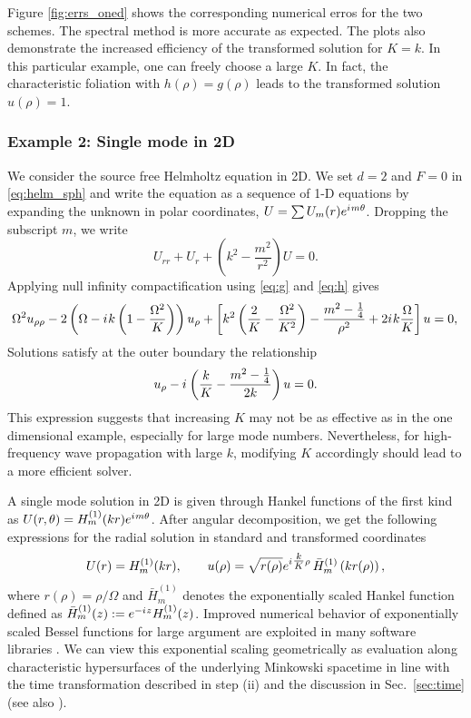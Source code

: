 \documentclass[final,onefignum,onetabnum]{siamart190516}
\newcommand{\iu}{{i\mkern1mu}}
\begin{document}
Figure \ref{fig:errs_oned} shows the corresponding numerical erros for the two schemes. The spectral method is more accurate as expected. The plots also demonstrate the increased efficiency of the transformed solution for $K=k$. In this particular example, one can freely choose a large $K$. In fact, the characteristic foliation with $h(\rho) =g(\rho)$ leads to the transformed solution $u(\rho)=1$. 

\subsubsection{Example 2: Single mode in 2D} 
We consider the source free Helmholtz equation in 2D. We set $d=2$ and $F=0$ in \eqref{eq:helm_sph} and write the equation as a sequence of 1-D equations by expanding the unknown in polar coordinates, $U=\sum U_m(r) e^{\iu m \theta}$. Dropping the subscript $m$, we write
\begin{equation}
	 U_{rr} + U_r + \left(k^2 - \frac{m^2}{r^2}\right)U = 0.
\end{equation}
Applying null infinity compactification using \eqref{eq:g} and \eqref{eq:h} gives 
\begin{equation}
\label{eq:hyp_2d}
	\Omega^2 u_{\rho\rho} - 2 \left(\Omega-\iu k \left(1-\frac{\Omega^2}{K}\right) \right) u_\rho + \left[k^2 \left(\frac{2}{K}-\frac{\Omega^2}{K^2}\right) - \frac{m^2-\tfrac{1}{4}}{\rho^2}  + 2 \iu k \frac{\Omega}{K} \right] u = 0,\\
\end{equation}
Solutions satisfy at the outer boundary the relationship
\[ u_\rho - \iu \left(\frac{k}{K} - \frac{m^2-\tfrac{1}{4}}{2k}\right)u = 0.  \]
This expression suggests that increasing $K$ may not be as effective as in the one dimensional example, especially for large mode numbers. Nevertheless, for high-frequency wave propagation with large $k$, modifying $K$ accordingly should lead to a more efficient solver.

A single mode solution in 2D is given through Hankel functions of the first kind as  $U(r, \theta) = H_m^{(1)}(k r) e^{\iu m \theta}$. After angular decomposition, we get the following expressions for the radial solution in standard and transformed coordinates
\begin{equation}\label{eq:hankel_soln}
	U(r) = H_m^{(1)}(k r), \qquad u(\rho) = \sqrt{r(\rho)} e^{\iu \tfrac{k}{K} \rho} \, \bar{H}_m^{(1)}\left(k r(\rho)\right),
\end{equation}
where $r(\rho)=\rho/\Omega$ and $\bar{H}_{m}^{(1)}$ denotes the exponentially scaled Hankel function defined as $\bar{H}_{m}^{(1)}(z) := e^{-\iu z} H_{m}^{(1)}(z)$. Improved numerical behavior of exponentially scaled Bessel functions for large argument are exploited in many software libraries \cite{amos1986algorithm, 2020SciPy-NMeth}. We can view this exponential scaling geometrically as evaluation along characteristic hypersurfaces of the underlying Minkowski spacetime in line with the time transformation described in step (ii) and the discussion in Sec.~\ref{sec:time} (see also \cite{ZengFramework}).
\end{document}
